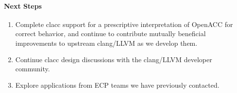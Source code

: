 \paragraph{Next Steps}

\begin{enumerate}

\item Complete clacc support for a prescriptive interpretation of OpenACC
for correct behavior, and continue to contribute mutually beneficial
improvements to upstream clang/LLVM as we develop them.

\item Continue clacc design discussions with the clang/LLVM developer
community.

\item Explore applications from ECP teams we have previously contacted.
	
\end{enumerate}
